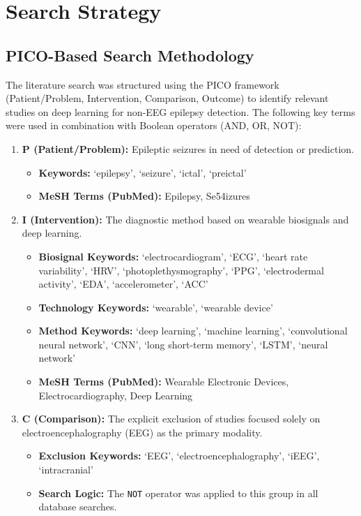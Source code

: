 \section{Search Strategy}
\label{sec:pico-search}

\subsection{PICO-Based Search Methodology}
The literature search was structured using the PICO framework 
(Patient/Problem, Intervention, Comparison, Outcome) 
to identify relevant studies on deep learning for non-EEG epilepsy
detection. The following key terms were used in combination with 
Boolean operators (AND, OR, NOT):

\begin{enumerate}
    \item \textbf{P (Patient/Problem):} Epileptic seizures in need of detection or prediction.
    \begin{itemize}
        \item \textbf{Keywords:} `epilepsy', `seizure', `ictal', `preictal'
        \item \textbf{MeSH Terms (PubMed):} Epilepsy, Se54izures
    \end{itemize}

    \item \textbf{I (Intervention):} The diagnostic method based on wearable biosignals and deep learning.
    \begin{itemize}
        \item \textbf{Biosignal Keywords:} `electrocardiogram', `ECG', `heart rate variability', `HRV', `photoplethysmography', `PPG', `electrodermal activity', `EDA', `accelerometer', `ACC'
        \item \textbf{Technology Keywords:} `wearable', `wearable device'
        \item \textbf{Method Keywords:} `deep learning', `machine learning', `convolutional neural network', `CNN', `long short-term memory', `LSTM', `neural network'
        \item \textbf{MeSH Terms (PubMed):} Wearable Electronic Devices, Electrocardiography, Deep Learning
    \end{itemize}

    \item \textbf{C (Comparison):} The explicit exclusion of studies focused solely on electroencephalography (EEG) as the primary modality.
    \begin{itemize}
        \item \textbf{Exclusion Keywords:} `EEG', `electroencephalography', `iEEG', `intracranial'
        \item \textbf{Search Logic:} The \texttt{NOT} operator was applied to this group in all database searches.
    \end{itemize}


\end{enumerate}
